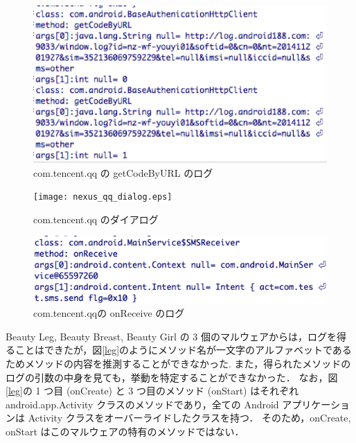 \begin{figure}[t]
\begin{center}
\graphicspath{{./epsfiles/}}
\includegraphics[scale=0.5]{baseauthentication_qq.eps}
\end{center}
\caption{com.tencent.qq の getCodeByURL のログ}
\label{qqauthentication}
\end{figure}


\begin{figure}[t]
\begin{center}
\graphicspath{{./epsfiles/}}
\texttt{[image: nexus\_qq\_dialog.eps]}
\end{center}
\caption{com.tencent.qq のダイアログ}
\label{dialog}
\end{figure}

\begin{figure}[t]
\begin{center}
\graphicspath{{./epsfiles/}}
\includegraphics[scale=0.3]{SmsReceiver_qq.eps}
\end{center}
\caption{com.tencent.qqの onReceive のログ}
\label{qqreceive}
\end{figure}

Beauty Leg, Beauty Breast, Beauty Girl の 3 個のマルウェアからは，ログを得ることはできたが，図\ref{leg}のようにメソッド名が一文字のアルファベットであるためメソッドの内容を推測することができなかった.
また，得られたメソッドのログの引数の中身を見ても，挙動を特定することができなかった．
なお，図\ref{leg}の 1 つ目 (onCreate) と 3 つ目のメソッド (onStart) はそれぞれ android.app.Activity クラスのメソッドであり，全ての Android アプリケーションは Activity クラスをオーバーライドしたクラスを持つ．
そのため，onCreate, onStart はこのマルウェアの特有のメソッドではない．

